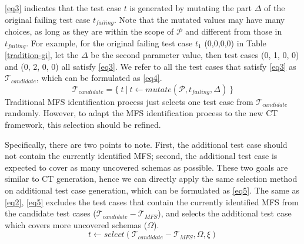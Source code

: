 \documentclass{sig-alternate}
\begin{document}
\ref{eq3} indicates that the test case $t$ is generated by mutating the part $\Delta$ of the original failing test case $t_{failing}$. Note that the mutated values may have many choices, as long as they are within the scope of $\mathcal{P}$ and different from those in $t_{failing}$. For example, for the original failing test case $t_{1}$ (0,0,0,0) in Table \ref{tradition-gi}, let the $\Delta$ be the second parameter value, then test cases (0, 1, 0, 0) and (0, 2, 0, 0) all satisfy \ref{eq3}. We refer to all the test cases that satisfy \ref{eq3} as $\mathcal{T}_{candidate}$, which can be formulated  as   \ref{eq4}.
\begin{displaymath}\mathcal{T}_{candidate} =  \{\ t\ |\ t \leftarrow  mutate (\mathcal{P}, t_{failing}, \Delta )\ \} \tag{EQ4} \label{eq4} \end{displaymath}
Traditional MFS identification process just selects one test case from $\mathcal{T}_{candidate}$ randomly. However, to adapt the MFS identification process to the new CT framework, this selection should be refined.

Specifically, there are two points to note. First, the additional test case should not contain the currently identified MFS; second, the additional test case is expected to cover as many uncovered schemas as possible. These two goals are similar to CT generation, hence we can directly apply the same selection method on additional test case generation, which can be formulated as \ref{eq5}.  The same as \ref{eq2}, \ref{eq5} excludes the test cases that contain the currently identified MFS from the candidate test cases ($\mathcal{T}_{candidate} - \mathcal{T}_{MFS}$), and selects the additional test case which covers more uncovered schemas ($\Omega$).
\begin{displaymath}t \leftarrow  select (\mathcal{T}_{candidate} - \mathcal{T}_{MFS}, \Omega ,  \xi )  \tag{EQ5} \label{eq5} \end{displaymath}



\end{document}

